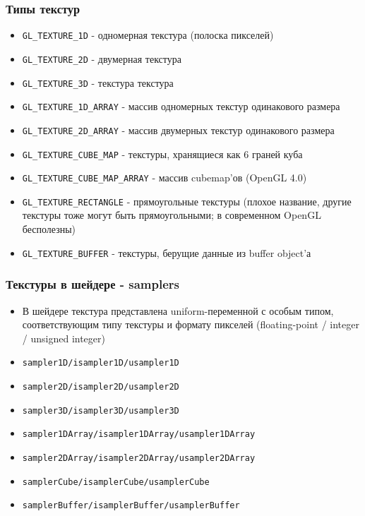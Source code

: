 \documentclass{beamer}
\begin{document}
\begin{frame}[fragile]
\frametitle{Типы текстур}
\begin{itemize}
\item \verb|GL_TEXTURE_1D| - одномерная текстура (полоска пикселей)
\pause
\item \verb|GL_TEXTURE_2D| - двумерная текстура
\pause
\item \verb|GL_TEXTURE_3D| - текстура текстура
\pause
\item \verb|GL_TEXTURE_1D_ARRAY| - массив одномерных текстур одинакового размера
\pause
\item \verb|GL_TEXTURE_2D_ARRAY| - массив двумерных текстур одинакового размера
\pause
\item \verb|GL_TEXTURE_CUBE_MAP| - текстуры, хранящиеся как 6 граней куба
\pause
\item \verb|GL_TEXTURE_CUBE_MAP_ARRAY| - массив cubemap'ов (OpenGL 4.0)
\pause
\item \verb|GL_TEXTURE_RECTANGLE| - прямоугольные текстуры \pause (плохое название, другие текстуры тоже могут быть прямоугольными; в современном OpenGL бесполезны)
\pause
\item \verb|GL_TEXTURE_BUFFER| - текстуры, берущие данные из buffer object'а
\end{itemize}
\end{frame}

\begin{frame}[fragile]
\frametitle{Текстуры в шейдере - samplers}
\begin{itemize}
\item В шейдере текстура представлена uniform-переменной с особым типом, соответствующим типу текстуры и формату пикселей (floating-point / integer / unsigned integer)
\pause
\item \verb|sampler1D/isampler1D/usampler1D|
\pause
\item \verb|sampler2D/isampler2D/usampler2D|
\pause
\item \verb|sampler3D/isampler3D/usampler3D|
\pause
\item \verb|sampler1DArray/isampler1DArray/usampler1DArray|
\pause
\item \verb|sampler2DArray/isampler2DArray/usampler2DArray|
\pause
\item \verb|samplerCube/isamplerCube/usamplerCube|
\pause
\item \verb|samplerBuffer/isamplerBuffer/usamplerBuffer|
\end{itemize}
\end{frame}
\end{document}
